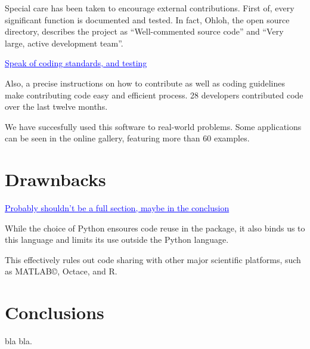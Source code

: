 \documentclass[twoside,11pt]{article}
\newcommand{\GAEL}[1]{\textcolor{blue}{\uline{#1}}}
\begin{document}
Special care has been taken to encourage external contributions. First
of, every significant function is documented and tested. In fact,
Ohloh, the open source directory, describes the project as
``Well-commented source code'' and ``Very large, active development
team''.

\GAEL{Speak of coding standards, and testing} 

Also, a precise instructions on how to contribute as well as coding
guidelines make contributing code easy and efficient process. 28
developers contributed code over the last twelve months.

We have succesfully used this software to real-world problems. Some
applications can be seen in the online gallery, featuring more than 60
examples.


\section{Drawnbacks}

\GAEL{Probably shouldn't be a full section, maybe in the conclusion}

While the choice of Python ensoures code reuse in the package, it also
binds us to this language and limits its use outside the Python
language.

This effectively rules out code sharing with other major scientific
platforms, such as MATLAB©, Octace, and R.


\section{Conclusions}

bla bla.
\end{document}
